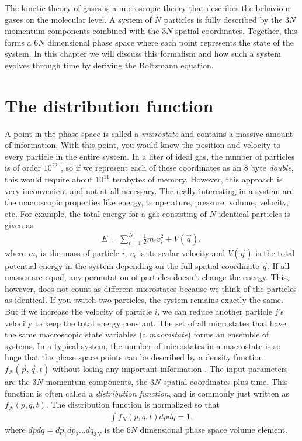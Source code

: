 The kinetic theory of gases is a microscopic theory that describes the behaviour gases on the molecular level. A system of $N$ particles is fully described by the $3N$ momentum components combined with the $3N$ spatial coordinates. Together, this forms a $6N$ dimensional phase space where each point represents the state of the system. In this chapter we will discuss this formalism and how such a system evolves through time by deriving the Boltzmann equation. 

\section{The distribution function}
A point in the phase space is called a \textit{microstate} and contains a massive amount of information. With this point, you would know the position and velocity to every particle in the entire system. In a liter of ideal gas, the number of particles is of order $10^{22}$ \cite{garcia2000numerical}, so if we represent each of these coordinates as an 8 byte \textit{double}, this would require about $10^{11}$ terabytes of memory. However, this approach is very inconvenient and not at all necessary. The really interesting in a system are the macroscopic properties like energy, temperature, pressure, volume, velocity, etc. For example, the total energy for a gas consisting of $N$ identical particles is given as
\begin{align*}
	E = \sum_{i=1}^N \frac{1}{2} m_i v_i^2 + V(\vec q),
\end{align*}
where $m_i$ is the mass of particle $i$, $v_i$ is its scalar velocity and $V(\vec q)$ is the total potential energy in the system depending on the full spatial coordinate $\vec q$. If all masses are equal, any permutation of particles doesn't change the energy. This, however, does not count as different microstates because we think of the particles as identical. If you switch two particles, the system remains exactly the same. But if we increase the velocity of particle $i$, we can reduce another particle $j$'s velocity to keep the total energy constant. The set of all microstates that have the same macroscopic state variables (a \textit{macrostate}) forms an ensemble of systems. In a typical system, the number of microstates in a macrostate is so huge that the phase space points can be described by a density function $f_N(\vec p, \vec q, t)$ without losing any important information \cite{mcquarrie1973statistical}. The input parameters are the $3N$ momentum components, the $3N$ spatial coordinates plus time. This function is often called a \textit{distribution function}, and is commonly just written as $f_N(p, q, t)$. The distribution function is normalized so that
\begin{align}
	\int f_N(p, q, t) dpdq = 1,
\end{align}
where $dpdq=dp_1dp_2...dq_{3N}$ is the $6N$ dimensional phase space volume element. 

